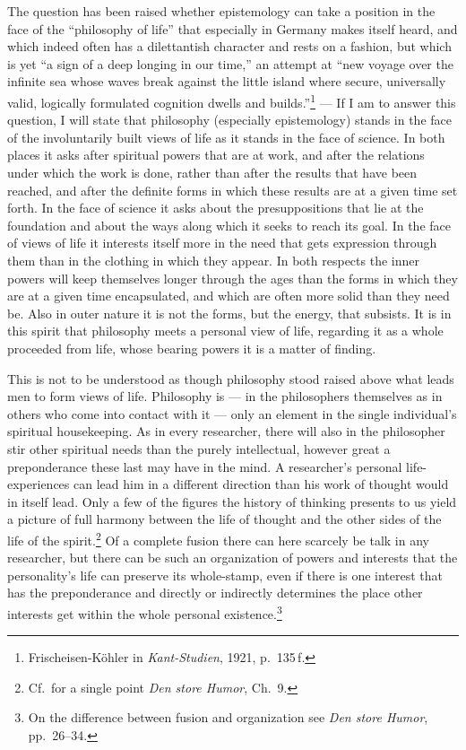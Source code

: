 \documentclass[12pt]{book}
\newcommand{\opage}[1]{\marginnote{\footnotesize\textit{[#1]}}}
\begin{document}
The question has been raised whether epistemology can take a position in the face of the ``philosophy of life'' that
especially in Germany makes itself heard, and which indeed often has a dilettantish character and rests on a fashion,
but which is yet ``a sign of a deep longing in our time,'' an attempt at ``new voyage over the infinite sea whose
waves break against the little island where secure, universally valid, logically formulated cognition dwells and
builds.''\footnote{Frischeisen-Köhler in \textit{Kant-Studien}, 1921, p.\ 135\,f.} --- If I am to answer this
question, I will state that philosophy (especially epistemology) stands in the face of the involuntarily built views
of life as it stands in the face of science. In both places it asks after spiritual powers that are at work, and after
the relations under which the work is done, rather than after the results that have been reached, and after the
definite forms in which these results are at a given time \opage{76}set forth. In the face of science it asks about the
presuppositions that lie at the foundation and about the ways along which it seeks to reach its goal. In the face of
views of life it interests itself more in the need that gets expression through them than in the clothing in which they
appear. In both respects the inner powers will keep themselves longer through the ages than the forms in which they are
at a given time encapsulated, and which are often more solid than they need be. Also in outer nature it is not the
forms, but the energy, that subsists. It is in this spirit that philosophy meets a personal view of life, regarding it
as a whole proceeded from life, whose bearing powers it is a matter of finding.

This is not to be understood as though philosophy stood raised above what leads men to form views of life. Philosophy
is --- in the philosophers themselves as in others who come into contact with it --- only an element in the single
individual's spiritual housekeeping. As in every researcher, there will also in the philosopher stir other spiritual
needs than the purely intellectual, however great a preponderance these last may have in the mind. A researcher's
personal life-experiences can lead him in a different direction than his work of thought would in itself lead. Only a
few of the figures the history of thinking presents to us yield a picture of full harmony between the life of thought
and the other sides of the life of the spirit.\footnote{Cf.\ for a single point \textit{Den store Humor}, Ch.\ 9.} Of a
complete fusion there can here scarcely be talk in any researcher, but there can be such an organization of powers and
interests that the personality's life can preserve its whole-stamp, even if there is one interest that has the
preponderance \opage{77}and directly or indirectly determines the place other interests get within the whole personal
existence.\footnote{On the difference between fusion and organization see \textit{Den store Humor}, pp.\ 26--34.}
\end{document}
